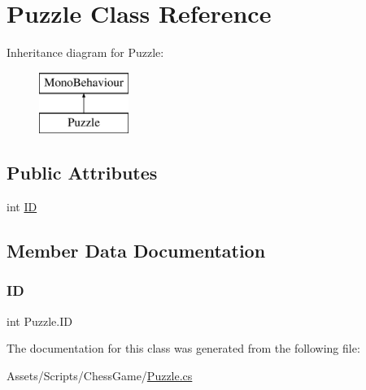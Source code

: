 \hypertarget{class_puzzle}{}\section{Puzzle Class Reference}
\label{class_puzzle}
Inheritance diagram for Puzzle\+:\begin{figure}[H]
\begin{center}
\leavevmode
\includegraphics[height=2.000000cm]{class_puzzle}
\end{center}
\end{figure}
\subsection*{Public Attributes}
\begin{DoxyCompactItemize}
\item 
int \mbox{\hyperlink{class_puzzle_a3570b0062c358cd4b94c923cffd40130}{ID}}
\end{DoxyCompactItemize}


\subsection{Member Data Documentation}
\mbox{\label{class_puzzle_a3570b0062c358cd4b94c923cffd40130}} 
\subsubsection{\texorpdfstring{ID}{ID}}
{\footnotesize\ttfamily int Puzzle.\+ID}



The documentation for this class was generated from the following file\+:\begin{DoxyCompactItemize}
\item 
Assets/\+Scripts/\+Chess\+Game/\mbox{\hyperlink{_puzzle_8cs}{Puzzle.\+cs}}\end{DoxyCompactItemize}
